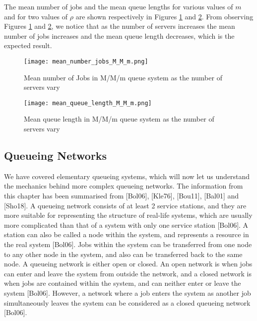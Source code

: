 \documentclass[a4paper,11pt,titlepage]{article}
\begin{document}
The mean number of jobs and the mean queue lengths for various values of $m$ and for two values of $\rho$ are shown respectively in Figures \ref{fig:mean_number_jobs_M_M_m} and \ref{fig:mean_queue_length_M_M_m}. From observing Figures \ref{fig:mean_number_jobs_M_M_m} and \ref{fig:mean_queue_length_M_M_m}, we notice that as the number of servers increases the mean number of jobs increases and the mean queue length decreases, which is the expected result. 

\begin{figure}[h!]
\begin{center}
\texttt{[image: mean\_number\_jobs\_M\_M\_m.png]}
\caption{Mean number of Jobs in M/M/m queue system as the number of servers vary}
\label{fig:mean_number_jobs_M_M_m}
\end{center}
\end{figure}

\begin{figure}[h!]
\begin{center}
\texttt{[image: mean\_queue\_length\_M\_M\_m.png]}
\caption{Mean queue length in M/M/m queue system as the number of servers vary}
\label{fig:mean_queue_length_M_M_m}
\end{center}
\end{figure}

\subsection{Queueing Networks}

We have covered elementary queueing systems, which will now let us understand the mechanics behind more complex queueing networks. The information from this chapter has been summarised from [Bol06], [Kle76], [Bou11], [Bal01] and [Sho18]. A queueing network consists of at least 2 service stations, and they are more suitable for representing the structure of real-life systems, which are usually more complicated than that of a system with only one service station [Bol06]. A station can also be called a node within the system, and represents a resource in the real system [Bol06]. Jobs within the system can be transferred from one node to any other node in the system, and also can be transferred back to the same node. A queueing network is either open or closed. An open network is when jobs can enter and leave the system from outside the network, and a closed network is when jobs are contained within the system, and can neither enter or leave the system [Bol06]. However, a network where a job enters the system as another job simultaneously leaves the system can be considered as a closed queueing network [Bol06].
\end{document}
